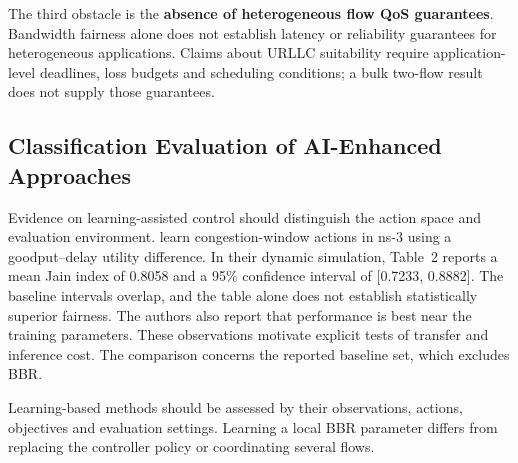 \documentclass[a4paper,fleqn]{cas-sc}
\begin{document}
The third obstacle is the \textbf{absence of heterogeneous flow QoS guarantees}.
Bandwidth fairness alone does not establish latency or reliability guarantees
for heterogeneous applications. Claims about URLLC suitability require
application-level deadlines, loss budgets and scheduling conditions;
a bulk two-flow result does not supply those guarantees.

\subsection{Classification Evaluation of AI-Enhanced Approaches}
\label{sec:ai}

Evidence on learning-assisted control should distinguish the action space
and evaluation environment. \citet{xiao2019tcpdrinc} learn congestion-window
actions in ns-3 using a goodput--delay utility difference. In their dynamic
simulation, Table~2 reports a mean Jain index of 0.8058 and a 95\%
confidence interval of [0.7233, 0.8882]. The baseline intervals overlap,
and the table alone does not establish statistically superior fairness.
The authors also report that performance is best near the training
parameters. These observations motivate explicit tests of transfer and inference
cost. The comparison concerns the reported baseline set, which excludes BBR.


Learning-based methods should be assessed by their observations, actions,
objectives and evaluation settings. Learning a local BBR parameter differs
from replacing the controller policy or coordinating several flows.
\end{document}

